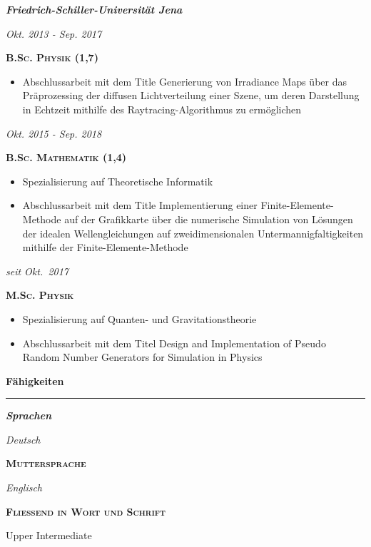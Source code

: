 \documentclass[8pt]{article}
\newcommand{\cvSectionStyle}{%
  \normalfont%
  \Large%
  \color{cvColor}%
  \bfseries%
  \sffamily%
}
\newcommand{\cvSubsectionStyle}{%
  \normalfont%
  \sffamily%
  \itshape%
  \bfseries%
}
\newcommand{\cvTimeStyle}{%
  \normalfont%
  \sffamily%
  \footnotesize%
  \itshape%
}
\newcommand{\cvSection}[1]{%
  \smallskip%
  {%
    \cvSectionStyle #1%
  }\\[-0.5em]
  \rule{\linewidth}{0.8pt}%
  \par%
  \smallskip%
}
\newcommand{\cvSubsection}[1]{%
  \begin{tcolorbox}[left=0pt, top=0pt, bottom=0pt, right=0pt, boxsep=5pt, arc=5pt, frame code={}, colback=cvBackgroundColor]
    \cvSubsectionStyle #1%
  \end{tcolorbox}
}
\newenvironment{cvItemize}{%
  \begin{itemize}[itemsep=0mm, leftmargin=4mm]
}{%
  \end{itemize}
}
\newenvironment{cvTimeItem}[2]{
  \par
  \begin{minipage}[c]{0.15\linewidth}
    \raggedleft
    \cvTimeStyle #1
  \end{minipage}
  \quad
  \vrule
  \quad
  \begin{minipage}[t]{0.79\linewidth}
    \sffamily\textsc{\color{cvColor} \textbf{#2}}
    \normalfont\footnotesize\sffamily
}{
  \end{minipage}
  \par%
  \vspace{\baselineskip}%
}
\newenvironment{cvSkillItem}[2]{
  \par
  \begin{minipage}[c]{0.2\linewidth}
    \raggedleft
    \normalfont
    \sffamily
    \itshape
    #1
  \end{minipage}
  \hspace{0.02\linewidth}
  \vrule
  \hspace{0.02\linewidth}
  \begin{minipage}[t]{0.74\linewidth}
    \sffamily\textsc{\color{cvColor} \textbf{#2}}\par
      \normalfont\footnotesize\sffamily
}{
  \end{minipage}
  \par%
  \vspace{\baselineskip}%
}
\begin{document}
  \cvSubsection{Friedrich-Schiller-Universität Jena}
  \begin{cvTimeItem}{Okt. 2013 - Sep. 2017}{B.Sc. Physik (1,7)}
  \begin{cvItemize}
    \item Abschlussarbeit mit dem Title Generierung von Irradiance Maps über das Präprozessing der diffusen Lichtverteilung einer Szene, um deren Darstellung in Echtzeit mithilfe des Raytracing-Algorithmus zu ermöglichen
  \end{cvItemize}
  \end{cvTimeItem}
  \begin{cvTimeItem}{Okt. 2015 - Sep. 2018}{B.Sc. Mathematik (1,4)}
  \begin{cvItemize}
    \item Spezialisierung auf Theoretische Informatik
    \item Abschlussarbeit mit dem Title Implementierung einer Finite-Elemente-Methode auf der Grafikkarte über die numerische Simulation von Lösungen der idealen Wellengleichungen auf zweidimensionalen Untermannigfaltigkeiten mithilfe der Finite-Elemente-Methode
  \end{cvItemize}
  \end{cvTimeItem}
  \begin{cvTimeItem}{seit Okt.~2017}{M.Sc. Physik}
  \begin{cvItemize}
    \item Spezialisierung auf Quanten- und Gravitationstheorie
    \item Abschlussarbeit mit dem Titel Design and Implementation of Pseudo Random Number Generators for Simulation in Physics
  \end{cvItemize}
  \end{cvTimeItem}

  \cvSection{Fähigkeiten}
  \cvSubsection{Sprachen}
  \vspace{-1.8em}
  \begin{multicols}{2}
  \begin{cvSkillItem}{Deutsch}{Muttersprache}
  \end{cvSkillItem}
  \begin{cvSkillItem}{Englisch}{Fließend in Wort und Schrift}
    Upper Intermediate
  \end{cvSkillItem}
  \end{multicols}
  \vspace{-1em}
\end{document}
